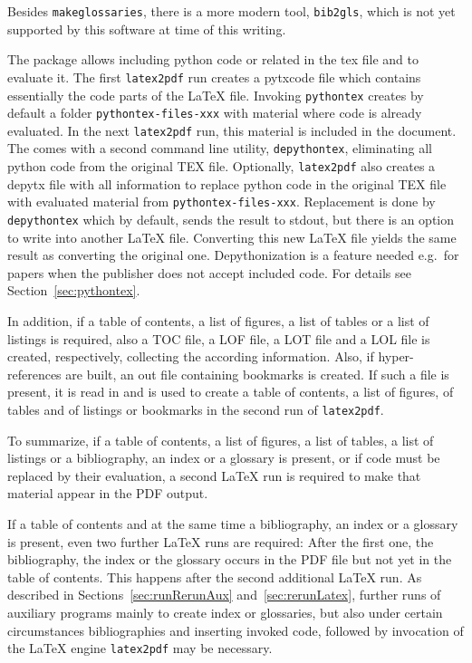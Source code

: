 Besides \texttt{makeglossaries}, there is a more modern tool, 
\texttt{bib2gls}, which is not yet supported by this software 
at time of this writing. 

The package  allows including python code or related 
in the \gls{tex} file and to evaluate it. 
The first \texttt{latex2pdf} run creates a \gls{pytxcode} file 
which contains essentially the code parts of the \LaTeX{} file. 
Invoking \texttt{pythontex} creates by default 
a folder \texttt{pythontex-files-xxx} 
with material where code is already evaluated. 
In the next \texttt{latex2pdf} run, this material is included in the document. 
The  comes with a second command line utility, 
\texttt{depythontex}, eliminating all python code from the original TEX file. 
Optionally, \texttt{latex2pdf} also creates a \gls{depytx} file 
with all information to replace python code in the original TEX file 
with evaluated material from \texttt{pythontex-files-xxx}. 
Replacement is done by \texttt{depythontex} 
which by default, sends the result to stdout, 
but there is an option to write into another \LaTeX{} file. 
Converting this new \LaTeX{} file 
yields the same result as converting the original one. 
Depythonization is a feature needed e.g.~for papers 
when the publisher does not accept included code. 
For details see Section~\ref{sec:pythontex}. 

In addition, if
a table of contents, a list of figures, a list of tables 
or a list of listings is required, 
also a TOC file, a LOF file, a LOT file and a LOL file is created,
respectively, 
collecting the according information. 
Also, if hyper-references are built, an \gls{out} file 
containing bookmarks is created. 
If such a file is present, it is read in and is used
to create a table of contents, a list of figures, of tables and of listings 
or bookmarks in the second run of \texttt{latex2pdf}. 

To summarize, 
if a table of contents, a list of figures, a list of tables, a list of listings or 
a bibliography, an index or a glossary is present, 
or if code must be replaced by their evaluation, 
a second \LaTeX{} run is required to make that material appear in the PDF output. 

If a table of contents and at the same time 
a bibliography, an index or a glossary is present, 
even two further \LaTeX{} runs are required: 
After the first one, the bibliography, the index or the glossary 
occurs in the PDF file but not yet in the table of contents. 
This happens after the second additional \LaTeX{} run. 
As described in Sections~\ref{sec:runRerunAux} and~\ref{sec:rerunLatex}, 
further runs of auxiliary programs mainly to create index or glossaries, 
but also under certain circumstances bibliographies and inserting invoked code, 
followed by invocation of the \LaTeX{} engine \texttt{latex2pdf} may be necessary. 

